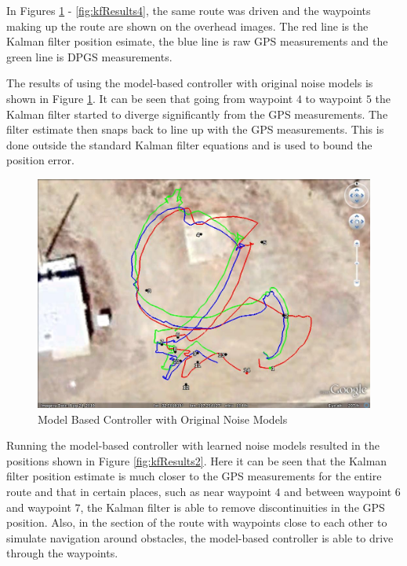 In Figures \ref{fig:kfResults1} - \ref{fig:kfResults4}, the same route was driven and the waypoints making up the route are shown on the overhead images. The red line is the Kalman filter position esimate, the blue line is raw GPS measurements and the green line is DPGS measurements.

The results of using the model-based controller with original noise models is shown in Figure \ref{fig:kfResults1}. It can be seen that going from waypoint $4$ to waypoint $5$ the Kalman filter started to diverge significantly from the GPS measurements. The filter estimate then snaps back to line up with the GPS measurements. This is done outside the standard Kalman filter equations and is used to bound the position error.

\begin{figure}[ht!]
	\centering
	\includegraphics[width=.75\textwidth]{images/GE/20101203_1551_kf_lyapOrigQR}
	\caption{Model Based Controller with Original Noise Models}
	\label{fig:kfResults1}
\end{figure}

Running the model-based controller with learned noise models resulted in the positions shown in Figure \ref{fig:kfResults2}. Here it can be seen that the Kalman filter position estimate is much closer to the GPS measurements for the entire route and that in certain places, such as near waypoint $4$ and between waypoint $6$ and waypoint $7$, the Kalman filter is able to remove discontinuities in the GPS position. Also, in the section of the route with waypoints close to each other to simulate navigation around obstacles, the model-based controller is able to drive through the waypoints.

